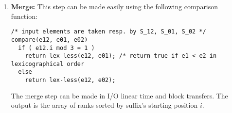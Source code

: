 \documentclass[a4paper]{article}
\begin{document}
\begin{enumerate}
\item \textbf{Merge:}
This step can be made easily using the following comparison function:
\begin{verbatim}
/* input elements are taken resp. by S_12, S_01, S_02 */
compare(e12, e01, e02) 
  if ( e12.i mod 3 = 1 )  
    return lex-less(e12, e01); /* return true if e1 < e2 in lexicographical order 
  else
    return lex-less(e12, e02);
\end{verbatim}
The merge step can be made in I/O linear time and block transfers.
The output is the array of ranks sorted by suffix's starting position $i$.
\end{enumerate} 
\end{document}
